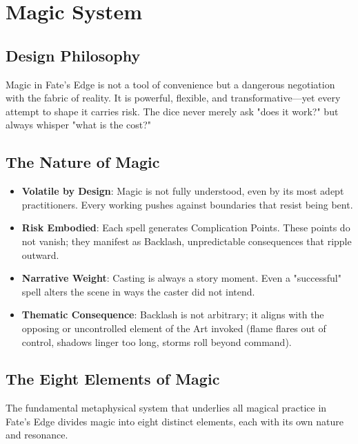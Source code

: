 \chapter{Magic System}

\section{Design Philosophy}

Magic in Fate's Edge is not a tool of convenience but a dangerous negotiation with the fabric of reality. It is powerful, flexible, and transformative---yet every attempt to shape it carries risk. The dice never merely ask "does it work?" but always whisper "what is the cost?"

\section{The Nature of Magic}

\begin{itemize}
\item \textbf{Volatile by Design}: Magic is not fully understood, even by its most adept practitioners. Every working pushes against boundaries that resist being bent.
\item \textbf{Risk Embodied}: Each spell generates Complication Points. These points do not vanish; they manifest as Backlash, unpredictable consequences that ripple outward.
\item \textbf{Narrative Weight}: Casting is always a story moment. Even a "successful" spell alters the scene in ways the caster did not intend.
\item \textbf{Thematic Consequence}: Backlash is not arbitrary; it aligns with the opposing or uncontrolled element of the Art invoked (flame flares out of control, shadows linger too long, storms roll beyond command).
\end{itemize}

\section{The Eight Elements of Magic}

The fundamental metaphysical system that underlies all magical practice in Fate's Edge divides magic into eight distinct elements, each with its own nature and resonance.


